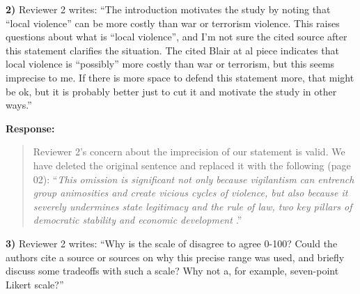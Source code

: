 \documentclass[a4paper,12pt]{article}
\begin{document}
\vspace{.3cm}

\noindent \textbf{2)} Reviewer 2 writes: ``The introduction motivates the study
by noting that ``local violence'' can be more costly than war or terrorism
violence. This raises questions about what is ``local violence'', and I'm not
sure the cited source after this statement clarifies the situation. The cited
Blair at al piece indicates that local violence is ``possibly'' more costly
than war or terrorism, but this seems imprecise to me. If there is more space
to defend this statement more, that might be ok, but it is probably better just
to cut it and motivate the study in other ways.''

\vspace{.3cm}

\noindent \textbf{Response:} 
\begin{quote}

Reviewer 2's concern about the imprecision of our statement is valid. We have
deleted the original sentence and replaced it with the following (page 02):
``\textit{This omission is significant not only because vigilantism can
  entrench group animosities and create vicious cycles of violence, but also
because it severely undermines state legitimacy and the rule of law, two key
pillars of democratic stability and economic development
\citep{jung2020lynching, tankebe2009self}}.''

\end{quote}

\vspace{.3cm}

\noindent \textbf{3)} Reviewer 2 writes: ``Why is the scale of disagree to
agree 0-100? Could the authors cite a source or sources on why this precise
range was used, and briefly discuss some tradeoffs with such a scale? Why not
a, for example, seven-point Likert scale?''

\vspace{.3cm}
\end{document}
